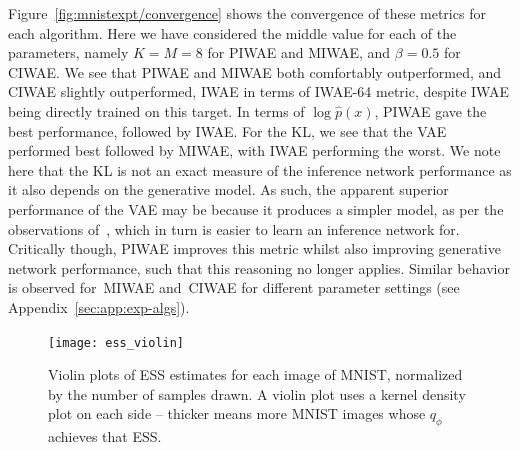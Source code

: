 Figure~\ref{fig:mnistexpt/convergence} shows the convergence of these metrics
for each algorithm.  Here we have considered
the middle value for each of the parameters, namely $K=M=8$
for \gls{PIWAE} and \gls{MIWAE}, and $\beta=0.5$ for \gls{CIWAE}.  
We see that \gls{PIWAE} and \gls{MIWAE} both
comfortably outperformed, and \gls{CIWAE} slightly outperformed,
\gls{IWAE} in terms of \gls{IWAE}-64 metric, despite
\gls{IWAE} being directly trained on this target.  In terms of 
$\log \hat{p}(x)$, \gls{PIWAE} gave the best performance, 
followed by \gls{IWAE}.  For the \textsc{KL}, we see that
the \gls{VAE} performed best followed by \gls{MIWAE}, 
with \gls{IWAE} performing the worst.  
We note here that the \textsc{KL} is not an exact
measure of the inference network performance as it also depends on the generative model.
As such, the apparent superior performance of the \gls{VAE} may be because it produces a
simpler model, as per the observations of~\citet{burda2016importance}, which in turn is easier
to learn an inference network for.  Critically though,
\gls{PIWAE} improves this metric whilst also improving generative network performance, such
that this reasoning no longer applies.  Similar behavior is observed for~\gls{MIWAE} and~\gls{CIWAE}
for different parameter settings (see Appendix~\ref{sec:app:exp-algs}).



\begin{figure}[t!]
	\centering
	\texttt{[image: ess\_violin]}\vspace{-10pt}
	\caption{Violin plots of ESS estimates for each image of MNIST,
		normalized by the number of samples drawn. A violin plot uses a kernel density plot on each side -- thicker means more MNIST images whose $q_{\phi}$ achieves that ESS. 
		\vspace{-17pt}  \label{fig:violiness}}
\end{figure}

